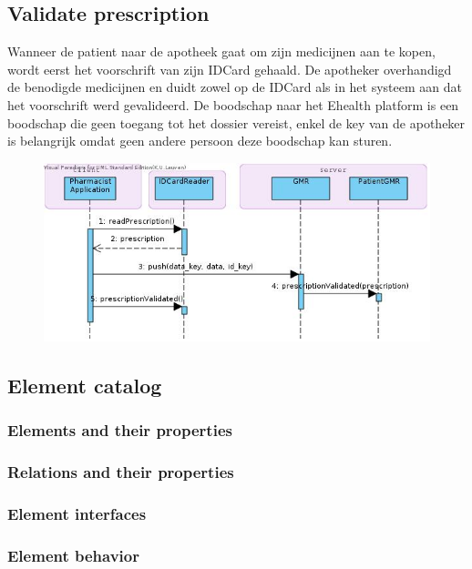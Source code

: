 \documentclass[a4paper,10pt]{article}
\begin{document}
\subsection{Validate prescription}
Wanneer de patient naar de apotheek gaat om zijn medicijnen aan te kopen, wordt eerst het voorschrift van zijn IDCard gehaald. De apotheker overhandigd de benodigde medicijnen en duidt zowel op de IDCard als in het systeem aan dat het voorschrift werd gevalideerd. De boodschap naar het Ehealth platform is een boodschap die geen toegang tot het dossier vereist, enkel de key van de apotheker is belangrijk omdat geen andere persoon deze boodschap kan sturen. 
\begin{center}
    \begin{figure}[!h]
      \includegraphics[width=\textwidth]{../images/validatePrescription.jpg}
    \end{figure}
  \end{center}

\subsection{Element catalog}

\subsubsection{Elements and their properties}

\subsubsection{Relations and their properties}

\subsubsection{Element interfaces}

\subsubsection{Element behavior}
\end{document}
